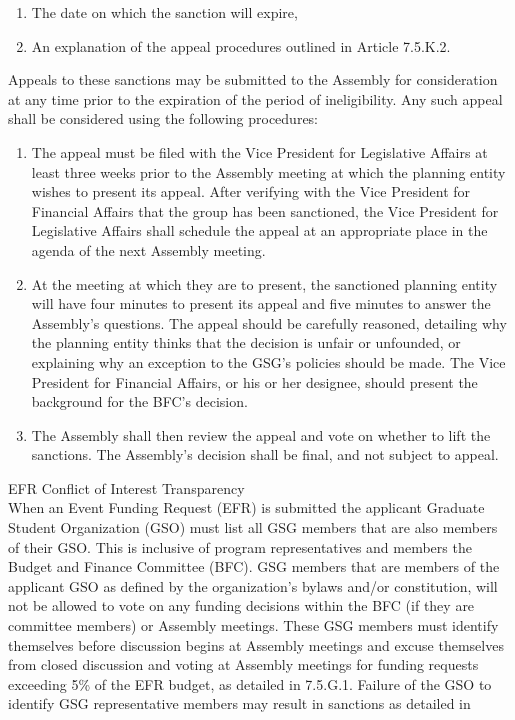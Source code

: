 \begin{bylaws-number}
\begin{bylaws-number}
\begin{enumerate}[i]
    \item The date on which the sanction will expire,
    \item An explanation of the appeal procedures outlined in Article 7.5.K.2.
  \end{enumerate}
    \item Appeals to these sanctions may be submitted to the Assembly for consideration at any time prior to the expiration of the period of ineligibility. Any such appeal shall be considered using the following procedures:
    \begin{enumerate}[i]
      \item The appeal must be filed with the Vice President for Legislative Affairs at least three weeks prior to the Assembly meeting at which the planning entity wishes to present its appeal. After verifying with the Vice President for Financial Affairs that the group has been sanctioned, the Vice President for Legislative Affairs shall schedule the appeal at an appropriate place in the agenda of the next Assembly meeting.
      \item At the meeting at which they are to present, the sanctioned planning entity will have four minutes to present its appeal and five minutes to answer the Assembly’s questions. The appeal should be carefully reasoned, detailing why the planning entity thinks that the decision is unfair or unfounded, or explaining why an exception to the GSG’s policies should be made. The Vice President for Financial Affairs, or his or her designee, should present the background for the BFC’s decision.
      \item The Assembly shall then review the appeal and vote on whether to lift the sanctions. The Assembly’s decision shall be final, and not subject to appeal.
    \end{enumerate}
  \end{bylaws-number}
  \item EFR Conflict of Interest Transparency \hfill \\
  When an Event Funding Request (EFR) is submitted the applicant Graduate Student Organization (GSO) must list all GSG members that are also members of their GSO. This is inclusive of program representatives and members the Budget and Finance Committee (BFC). GSG members that are members of the applicant GSO as defined by the organization’s bylaws and/or constitution, will not be allowed to vote on any funding decisions within the BFC (if they are committee members) or Assembly meetings. These GSG members must identify themselves before discussion begins at Assembly meetings and excuse themselves from closed discussion and voting at Assembly meetings for funding requests exceeding 5\% of the EFR budget, as detailed in 7.5.G.1. Failure of the GSO to identify GSG representative members may result in sanctions as detailed in

\end{bylaws-number}
